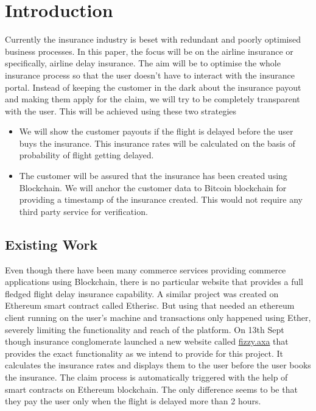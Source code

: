 \chapter{Introduction}

Currently the insurance industry is beset with redundant and poorly optimised business processes. In this paper, the focus will be on the airline insurance or specifically, airline delay insurance. The aim will be to optimise the whole insurance process so that the user doesn't have to interact with the insurance portal. Instead of keeping the customer in the dark about the insurance payout and making them apply for the claim, we will try to be completely  transparent with the user. This will be  achieved using these two strategies
\begin{itemize}
    \item We will show the customer payouts if the flight is delayed before the user buys the insurance. This insurance rates will be calculated on the basis of probability of flight getting delayed.
    \item The customer will be assured that the insurance has been created using Blockchain. We will anchor the customer data to Bitcoin blockchain for providing a timestamp of the insurance created. This would not require any third party service for verification.
\end{itemize}

\section{Existing Work}
Even though there have been many commerce services providing commerce applications using Blockchain, there is no particular website that provides a full fledged flight delay insurance capability. A similar project was created on Ethereum smart contract called Etherisc. But using that needed an ethereum client running on the user's machine and transactions only happened using Ether, severely limiting the functionality and reach of the platform.
On 13th Sept though insurance conglomerate launched a new website called \url{fizzy.axa} that provides the exact functionality as we intend to provide for this project. It calculates the insurance rates and displays them to the user before the user books the insurance. The claim process is automatically triggered with the help of smart contracts on Ethereum blockchain. The only difference seems to be that they pay the user only when the flight is delayed more than 2 hours.

